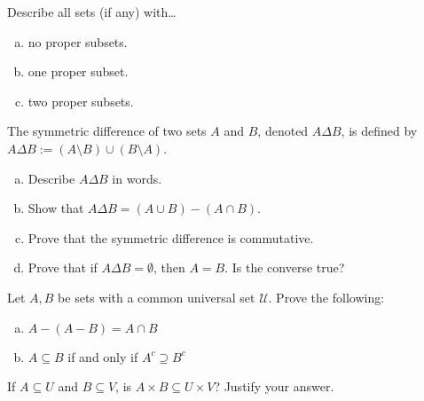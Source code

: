 \documentclass[11pt,letterpaper]{article}
\begin{document}
\homework{}

 Describe all sets (if any) with\dots
        \begin{enumerate}[(a)] 
        \item no proper subsets. 
        \item one proper subset. 
        \item two proper subsets. 
        \end{enumerate}





\newpage





 The symmetric difference of two sets $A$ and $B$, denoted $A \Delta B$, is defined by $A \Delta B:= (A \setminus B) \cup (B \setminus A)$. 
	\begin{enumerate}[(a)]
	\item Describe $A \Delta B$ in words. 
	\item Show that $A \Delta B= (A \cup B) - (A \cap B)$.
	\item Prove that the symmetric difference is commutative. 
	\item Prove that if $A \Delta B= \emptyset$, then $A= B$. Is the converse true? 
	\end{enumerate}





\newpage





 Let $A, B$ be sets with a common universal set $\mathscr{U}$. Prove the following:
	\begin{enumerate}[(a)]
	\item $A - (A - B)= A \cap B$
	\item $A \subseteq B$ if and only if $A^c \supseteq B^c$
	\end{enumerate}





\newpage





 If $A \subseteq U$ and $B \subseteq V$, is $A \times B \subseteq U \times V$? Justify your answer. \pspace





\newpage
\end{document}
